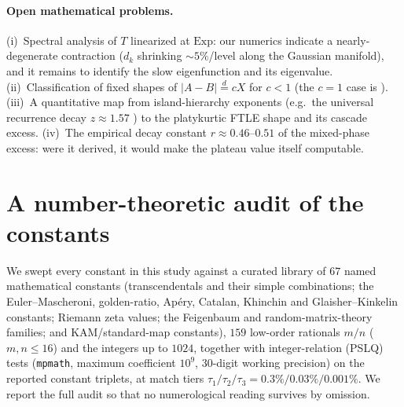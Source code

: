 \documentclass[11pt,a4paper]{article}
\theoremstyle{remark}
\newcommand{\Exp}{\mathrm{Exp}}
\newcommand{\eqd}{\stackrel{d}{=}}
\begin{document}
\paragraph{Open mathematical problems.} (i)~Spectral analysis of $T$ linearized at $\Exp$: our
numerics indicate a nearly-degenerate contraction ($d_k$ shrinking $\sim 5\%$/level along the
Gaussian manifold), and it remains to identify the slow eigenfunction and its eigenvalue.
(ii)~Classification of fixed shapes of $|A - B| \eqd cX$ for $c < 1$ (the $c = 1$ case is
\cite{purirubin}). (iii)~A quantitative map from island-hierarchy exponents (e.g.\ the universal
recurrence decay $z \approx 1.57$ \cite{cristadoro}) to the platykurtic FTLE shape and its cascade
excess. (iv)~The empirical decay constant $r \approx 0.46$--$0.51$ of the mixed-phase excess: were
it derived, it would make the plateau value itself computable.

\section{A number-theoretic audit of the constants}\label{sec:numbers}

We swept every constant in this study against a curated library of $67$ named mathematical constants
(transcendentals and their simple combinations; the Euler--Mascheroni, golden-ratio, Ap\'ery,
Catalan, Khinchin and Glaisher--Kinkelin constants; Riemann zeta values; the Feigenbaum and
random-matrix-theory families; and KAM/standard-map constants), $159$ low-order rationals $m/n$
($m,n\le16$) and the integers up to $1024$, together with integer-relation (PSLQ) tests (\texttt{mpmath},
maximum coefficient $10^{9}$, $30$-digit working precision) on the reported constant triplets, at
match tiers $\tau_1/\tau_2/\tau_3 = 0.3\%/0.03\%/0.001\%$. We report the full audit so that no
numerological reading survives by omission.
\end{document}
